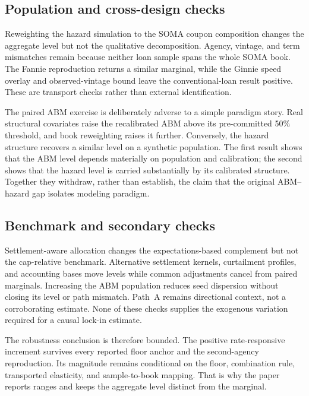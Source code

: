 \documentclass[12pt]{article}
\begin{document}
\subsection{Population and cross-design checks}\label{sec:robustness-crossdesign}\label{sec:robustness-hybrid}

Reweighting the hazard simulation to the SOMA coupon composition changes the
aggregate level but not the qualitative decomposition. Agency, vintage, and
term mismatches remain because neither loan sample spans the whole SOMA book.
The Fannie reproduction returns a similar marginal, while the Ginnie speed
overlay and observed-vintage bound leave the conventional-loan result positive.
These are transport checks rather than external identification.

The paired ABM exercise is deliberately adverse to a simple paradigm story.
Real structural covariates raise the recalibrated ABM above its pre-committed
50\% threshold, and book reweighting raises it further. Conversely, the hazard
structure recovers a similar level on a synthetic population. The first result
shows that the ABM level depends materially on population and calibration; the
second shows that the hazard level is carried substantially by its calibrated
structure. Together they withdraw, rather than establish, the claim that the
original ABM--hazard gap isolates modeling paradigm.

\subsection{Benchmark and secondary checks}\label{sec:robustness-benchmark}\label{sec:robustness-scale}\label{sec:robustness-synthesis}

Settlement-aware allocation changes the expectations-based complement but not
the cap-relative benchmark. Alternative settlement kernels, curtailment
profiles, and accounting bases move levels while common adjustments cancel
from paired marginals. Increasing the ABM population reduces seed dispersion
without closing its level or path mismatch. Path~A remains directional context,
not a corroborating estimate. None of these checks supplies the exogenous
variation required for a causal lock-in estimate.

The robustness conclusion is therefore bounded. The positive rate-responsive
increment survives every reported floor anchor and the second-agency
reproduction. Its magnitude remains conditional on the floor, combination
rule, transported elasticity, and sample-to-book mapping. That is why the paper
reports ranges and keeps the aggregate level distinct from the marginal.
\end{document}
